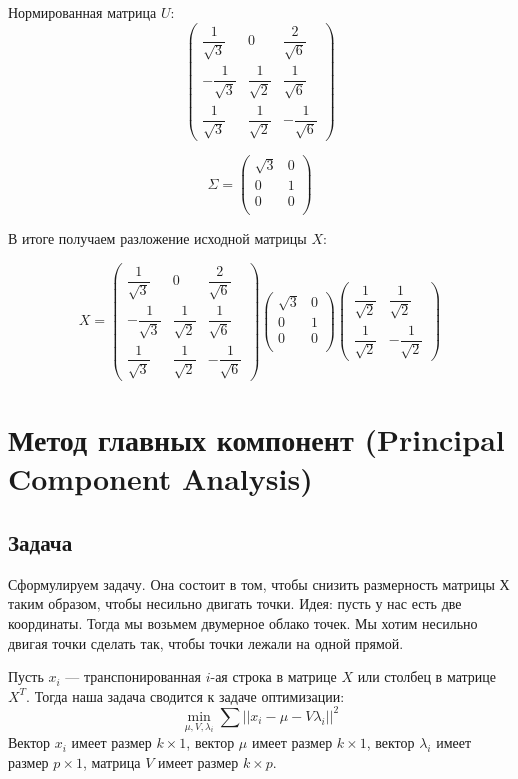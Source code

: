 \documentclass[12pt]{article} %
\theoremstyle{definition} %
\begin{document}
Нормированная матрица $U$:
\[
\begin{pmatrix}
\dfrac{1}{\sqrt{3}} & 0 & \dfrac{2}{\sqrt{6}} \\
-\dfrac{1}{\sqrt{3}} & \dfrac{1}{\sqrt{2}} & \dfrac{1}{\sqrt{6}} \\
\dfrac{1}{\sqrt{3}} & \dfrac{1}{\sqrt{2}} & -\dfrac{1}{\sqrt{6}}
\end{pmatrix}
\]

\[
\Sigma = \begin{pmatrix}
\sqrt{3} & 0 \\
0 & 1 \\
0 & 0 \\
\end{pmatrix}
\]

В итоге получаем разложение исходной матрицы $X$:

\[
X= \begin{pmatrix}
\dfrac{1}{\sqrt{3}} & 0 & \dfrac{2}{\sqrt{6}} \\
-\dfrac{1}{\sqrt{3}} & \dfrac{1}{\sqrt{2}} & \dfrac{1}{\sqrt{6}} \\
\dfrac{1}{\sqrt{3}} & \dfrac{1}{\sqrt{2}} & -\dfrac{1}{\sqrt{6}}
\end{pmatrix}  \begin{pmatrix}
\sqrt{3} & 0 \\
0 & 1 \\
0 & 0 \\
\end{pmatrix}
\begin{pmatrix}
\dfrac{1}{\sqrt{2}} & \dfrac{1}{\sqrt{2}} \\
\dfrac{1}{\sqrt{2}} & -\dfrac{1}{\sqrt{2}}
\end{pmatrix}
\]

\section{Метод главных компонент (Principal Component Analysis)}
\subsection{Задача}
Сформулируем задачу. Она состоит в том, чтобы снизить размерность матрицы $Х$ таким образом, чтобы несильно двигать точки.
Идея: пусть у нас есть две координаты. Тогда мы возьмем двумерное облако точек. Мы хотим несильно двигая точки сделать так, чтобы точки лежали на одной прямой.

Пусть $x_i$ — транспонированная $i$-ая строка в матрице $X$ или столбец в матрице $X^T$.
Тогда наша задача сводится к задаче оптимизации:
\[\min_{\mu, V, \lambda_i} \sum ||x_i-\mu-V \lambda_i||^2 \]
Вектор $x_i$ имеет размер $k \times 1$, вектор $\mu$ имеет размер $k \times 1$, вектор $\lambda_i$ имеет размер $p \times 1$, матрица $V$ имеет размер $k \times p$.
\end{document}
